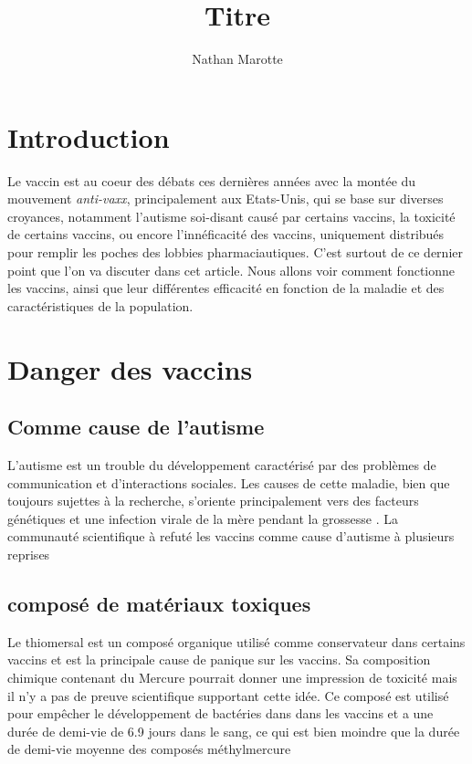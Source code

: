 \documentclass[10pt]{article}
\title{Titre}
\author{Nathan Marotte}
\begin{document}
\maketitle
\section{Introduction}
Le vaccin est au coeur des débats ces dernières années avec la montée du mouvement \textit{anti-vaxx}, principalement aux Etats-Unis, qui se base sur diverses croyances, notamment l'autisme soi-disant causé par certains vaccins, la toxicité de certains vaccins, ou encore l'innéficacité des vaccins, uniquement distribués pour remplir les poches des lobbies pharmaciautiques. C'est surtout de ce dernier point que l'on va discuter dans cet article. Nous allons voir comment fonctionne les vaccins, ainsi que leur différentes efficacité en fonction de la maladie et des caractéristiques de la population.

\section{Danger des vaccins}


\subsection{Comme cause de l'autisme}
L'autisme est un trouble du développement caractérisé par des problèmes de communication et d'interactions sociales. Les causes de cette maladie, bien que toujours sujettes à la recherche, s'oriente principalement vers des facteurs génétiques \cite{genetics} et une infection virale de la mère pendant la grossesse \cite{autism_viral}\cite{genetic_evaluation}. La communauté scientifique à refuté les vaccins comme cause d'autisme à plusieurs reprises \cite{develop_disorder_immunizations}\cite{vaccine_wars}\cite{evidence_based}

\subsection{composé de matériaux toxiques}
Le thiomersal est un composé organique utilisé comme conservateur dans certains vaccins et est la principale cause de panique sur les vaccins. Sa composition chimique contenant du Mercure pourrait donner une impression de toxicité mais il n'y a pas de preuve scientifique supportant cette idée.\cite{vaccines_do_not_cause_autism} Ce composé est utilisé pour empêcher le développement de bactéries dans dans les vaccins et a une durée de demi-vie de 6.9 jours dans le sang, ce qui est bien moindre que la durée de demi-vie moyenne des composés méthylmercure \cite{Thimerosal}
\end{document}
